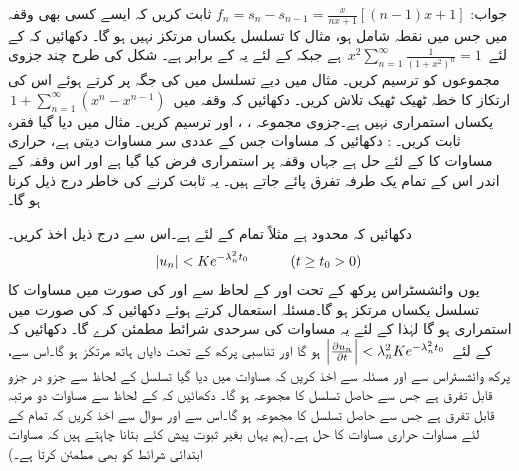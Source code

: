 جواب:\quad
$f_n=s_n-s_{n-1}=\frac{x}{nx+1}[(n-1)x+1]$
\quad
ثابت کریں کہ ایسے کسی بھی  وقفہ میں جس میں نقطہ  شامل ہو، مثال  کا تسلسل یکساں مرتکز نہیں ہو گا۔ 
\quad
دکھائیں کہ   کے لئے 
$\,x^2\sum\limits_{n=1}^{\infty} \tfrac{1}{(1+x^2)^n}=1\,$
ہے جبکہ  کے لئے یہ  کے برابر ہے۔ شکل  کی طرح چند جزوی مجموعوں کو ترسیم کریں۔
\quad
مثال  میں دیے تسلسل میں  کی جگہ  پر کرتے ہوئے اس کی  ارتکاز کا خطہ ٹھیک ٹھیک تلاش کریں۔
\quad
دکھائیں کہ وقفہ  میں 
$\,1+\sum\limits_{n=1}^{\infty} (x^n-x^{n-1})\,$
یکساں استمراری نہیں ہے۔جزوی مجموعہ ، ،  اور  ترسیم کریں۔
\quad
مثال  میں دیا گیا فقرہ ثابت کریں۔
: دکھائیں کہ مساوات  جس کے عددی سر مساوات  دیتی ہے، حراری مساوات کا   کے لئے حل ہے جہاں وقفہ  پر  استمراری فرض کیا گیا ہے اور اس وقفہ کے اندر اس کے تمام یک طرفہ تفرق پائے جاتے ہیں۔ یہ ثابت کرنے کی خاطر درج ذیل کرنا ہو گا۔

\quad
دکھائیں کہ  محدود ہے مثلاً تمام  کے لئے  ہے۔اس سے  درج ذیل اخذ کریں۔ 
\begin{align*}
\abs{u_n}<K e^{-\lambda_n^2 t_0}\quad \quad \quad (t\ge t_0 >0)
\end{align*}
یوں وائشسٹراس پرکھ  کے تحت   اور  کے لحاظ سے  اور  کی صورت میں مساوات  کا تسلسل یکساں مرتکز ہو گا۔مسئلہ  استعمال کرتے ہوئے دکھائیں کہ  کی صورت میں  استمراری ہو گا  لہٰذا  کے لئے یہ مساوات  کی سرحدی شرائط مطمئن کرے گا۔
\quad
دکھائیں کہ  کے لئے
$\,\abs{\frac{\partial u_n}{\partial t}}<\lambda^2_n Ke^{-\lambda^2_n t_0}\,$
ہو گا اور تناسبی پرکھ کے تحت دایاں ہاتھ مرتکز ہو گا۔اس سے، پرکھ وائشسٹراس سے اور مسئلہ  سے  اخذ کریں کہ مساوات  میں دیا گیا تسلسل  کے لحاظ سے جزو در جزو قابل تفرق ہے جس سے  حاصل تسلسل کا مجموعہ  ہو گا۔ دکھائیں کہ  کے لحاظ سے مساوات   دو مرتبہ قابل تفرق ہے جس سے  حاصل تسلسل کا مجموعہ
  ہو گا۔اس سے اور سوال  سے اخذ کریں کہ تمام  کے لئے مساوات  حراری مساوات کا حل ہے۔(ہم یہاں بغیر ثبوت پیش کئے بتانا چاہتے ہیں کہ مساوات  ابتدائی شرائط کو بھی مطمئن کرتا ہے۔)

